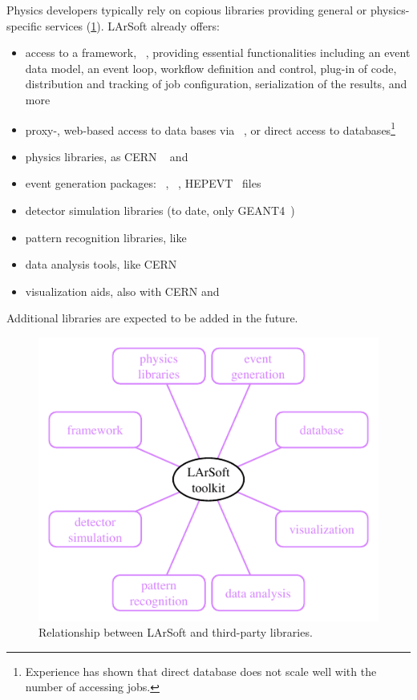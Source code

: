 Physics developers typically rely on copious libraries providing general or physics-specific services
(\cref{fig:LArSoftRelations:Libraries}).
LArSoft already offers:
\begin{itemize}
   \item access to a framework, \ART~\cite{ART}, providing essential functionalities
      including an event data model, an event loop, workflow definition and control,
      plug-in of code, distribution and tracking of job configuration,
      serialization of the results, and more
   \item proxy-, web-based access to data bases via \libwda~\cite{libwda},
      or direct access to \PostgreSQL databases\footnote{%
      Experience has shown that direct database does not scale well with the number of accessing jobs.%
      }
   \item physics libraries, as CERN \CLHEP~\cite{CLHEP} and \nutools~\cite{nutools}
   \item event generation packages: \GENIE~\cite{GENIE}, \CRY~\cite{CRY}, HEPEVT~\cite{HEPEVT} files
   \item detector simulation libraries (to date, only GEANT4~\cite{GEANT})
   \item pattern recognition libraries, like \Pandora
   \item data analysis tools, like CERN \ROOT~\cite{ROOT}
   \item visualization aids, also with CERN \ROOT and \nutools
\end{itemize}
Additional libraries are expected to be added in the future.
\begin{figure}
   \centering
   \includegraphics{figures/LArSoftThirdPartyLibraries}
   \caption[Relationship between LArSoft and third-party libraries]{
      \label{fig:LArSoftRelations:Libraries}
      Relationship between LArSoft and third-party libraries.
   }
\end{figure}
